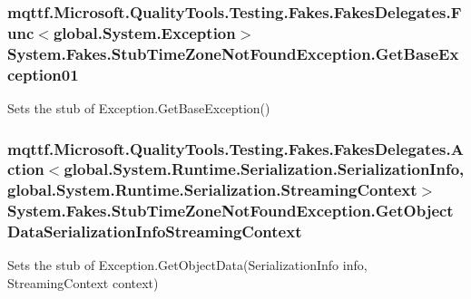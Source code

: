 \hypertarget{class_system_1_1_fakes_1_1_stub_time_zone_not_found_exception_a17bc2d5c734a7c2311b9392a6960f968}{
\subsubsection[{Get\-Base\-Exception01}]{\setlength{\rightskip}{0pt plus 5cm}mqttf.\-Microsoft.\-Quality\-Tools.\-Testing.\-Fakes.\-Fakes\-Delegates.\-Func$<$global.\-System.\-Exception$>$ System.\-Fakes.\-Stub\-Time\-Zone\-Not\-Found\-Exception.\-Get\-Base\-Exception01}}\label{class_system_1_1_fakes_1_1_stub_time_zone_not_found_exception_a17bc2d5c734a7c2311b9392a6960f968}


Sets the stub of Exception.\-Get\-Base\-Exception()

\hypertarget{class_system_1_1_fakes_1_1_stub_time_zone_not_found_exception_a8571573228e9ad153576778a42522223}{
\subsubsection[{Get\-Object\-Data\-Serialization\-Info\-Streaming\-Context}]{\setlength{\rightskip}{0pt plus 5cm}mqttf.\-Microsoft.\-Quality\-Tools.\-Testing.\-Fakes.\-Fakes\-Delegates.\-Action$<$global.\-System.\-Runtime.\-Serialization.\-Serialization\-Info, global.\-System.\-Runtime.\-Serialization.\-Streaming\-Context$>$ System.\-Fakes.\-Stub\-Time\-Zone\-Not\-Found\-Exception.\-Get\-Object\-Data\-Serialization\-Info\-Streaming\-Context}}\label{class_system_1_1_fakes_1_1_stub_time_zone_not_found_exception_a8571573228e9ad153576778a42522223}


Sets the stub of Exception.\-Get\-Object\-Data(\-Serialization\-Info info, Streaming\-Context context)

